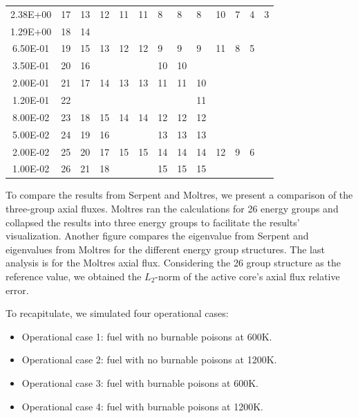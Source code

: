 \begin{table}[htbp!]
\begin{tabular}{c|llllllllllll}
  2.38E+00            & 17    & 13   & 12   & 11  & 11  & 8   & 8   & 8     & 10  & 7  & 4  & 3 \\ 
  1.29E+00            & 18    & 14   &      &     &     &     &     &       &     &    &    &   \\ 
  6.50E-01            & 19    & 15   & 13   & 12  & 12  & 9   & 9   & 9     & 11  & 8  & 5  &   \\ 
  3.50E-01            & 20    & 16   &      &     &     & 10  & 10  &       &     &    &    &   \\ 
  2.00E-01            & 21    & 17   & 14   & 13  & 13  & 11  & 11  & 10    &     &    &    &   \\ 
  1.20E-01            & 22    &      &      &     &     &     &     & 11    &     &    &    &   \\ 
  8.00E-02            & 23    & 18   & 15   & 14  & 14  & 12  & 12  & 12    &     &    &    &   \\ 
  5.00E-02            & 24    & 19   & 16   &     &     & 13  & 13  & 13    &     &    &    &   \\ 
  2.00E-02            & 25    & 20   & 17   & 15  & 15  & 14  & 14  & 14    & 12  & 9  & 6  &   \\ 
  1.00E-02            & 26    & 21   & 18   &     &     & 15  & 15  & 15    &     &    &    &   \\ 
  \bottomrule
  \end{tabular}
  \label{tab:energygroups}
\end{table}

To compare the results from Serpent and Moltres, we present a comparison of the three-group axial fluxes.
Moltres ran the calculations for 26 energy groups and collapsed the results into three energy groups to facilitate the results' visualization.
Another figure compares the eigenvalue from Serpent and eigenvalues from Moltres for the different energy group structures.
The last analysis is for the Moltres axial flux.
Considering the 26 group structure as the reference value, we obtained the $L_2$-norm of the active core's axial flux relative error.

To recapitulate, we simulated four operational cases: 
\begin{itemize}
  \item Operational case 1: fuel with no burnable poisons at 600K.
  \item Operational case 2: fuel with no burnable poisons at 1200K.
  \item Operational case 3: fuel with burnable poisons at 600K.
  \item Operational case 4: fuel with burnable poisons at 1200K.
\end{itemize}

